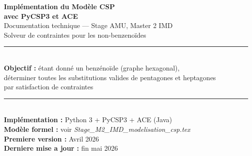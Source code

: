 \begin{titlepage}
  \centering
  \vspace*{2cm}
  {\huge\bfseries\color{primary}
    Implémentation du Modèle CSP\\[0.4em]
    avec PyCSP3 et ACE\\[1em]}
  {\large\color{gray} Documentation technique — Stage AMU, Master 2 IMD}\\[0.5em]
  {\large\color{gray} Solveur de contraintes pour les non-benzenoïdes}\\[3em]
  \rule{\linewidth}{0.5pt}\\[1em]
  {\large
    \textbf{Objectif :} étant donné un benzénoïde (graphe hexagonal),\\
    déterminer toutes les substitutions valides de pentagones et heptagones\\
    par satisfaction de contraintes
  }\\[1em]
  \rule{\linewidth}{0.5pt}\\[3em]
  {\normalsize
    \textbf{Implémentation :} Python 3 + PyCSP3 + ACE (Java)\\[0.5em]
    \textbf{Modèle formel :} voir \textit{Stage\_M2\_IMD\_modelisation\_csp.tex}\\[0.5em]
    \textbf{Premiere version :} Avril 2026\\[0.3em]
    \textbf{Derniere mise a jour :} fin mai 2026
  }
  \vfill
\end{titlepage}
